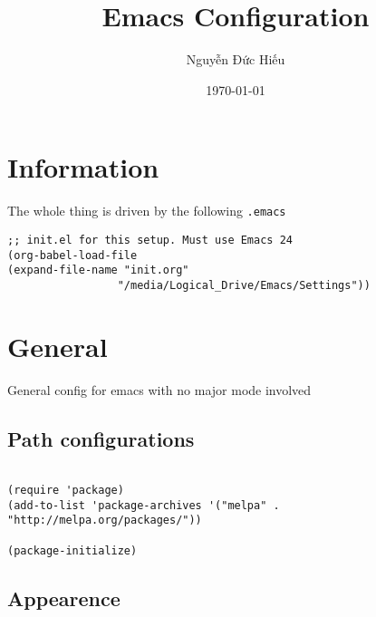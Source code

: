 \documentclass[11pt]{article}
\author{Nguyễn Đức Hiếu}
\date{\today}
\title{Emacs Configuration}
\begin{document}
\maketitle

\section{Information}
\label{sec:org23e560a}

The whole thing is driven by the following \texttt{.emacs}

\begin{verbatim}
;; init.el for this setup. Must use Emacs 24
(org-babel-load-file
(expand-file-name "init.org"
                 "/media/Logical_Drive/Emacs/Settings"))
\end{verbatim}

\section{General}
\label{sec:org63638fc}
General config for emacs with no major mode involved
\subsection{Path configurations}
\label{sec:orge429291}

\begin{verbatim}

(require 'package)
(add-to-list 'package-archives '("melpa" . "http://melpa.org/packages/"))

(package-initialize)

\end{verbatim}

\subsection{Appearence}
\label{sec:orgf215310}
\end{document}

